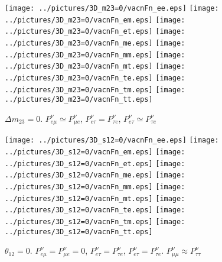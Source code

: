 \begin{figure}[!ht]
\vspace*{-0.75cm}
\texttt{[image: ../pictures/3D\_m23=0/vacnFn\_ee.eps]}\hspace*{-2mm}
\texttt{[image: ../pictures/3D\_m23=0/vacnFn\_em.eps]}\hspace*{-2mm}
\texttt{[image: ../pictures/3D\_m23=0/vacnFn\_et.eps]}\hspace*{-2mm}
\texttt{[image: ../pictures/3D\_m23=0/vacnFn\_me.eps]}\hspace*{-2mm}
\texttt{[image: ../pictures/3D\_m23=0/vacnFn\_mm.eps]}\hspace*{-2mm}
\texttt{[image: ../pictures/3D\_m23=0/vacnFn\_mt.eps]}\hspace*{-2mm}
\texttt{[image: ../pictures/3D\_m23=0/vacnFn\_te.eps]}\hspace*{-2mm}
\texttt{[image: ../pictures/3D\_m23=0/vacnFn\_tm.eps]}\hspace*{-2mm}
\texttt{[image: ../pictures/3D\_m23=0/vacnFn\_tt.eps]}
\caption{$\Delta{m_{23}}=0$. $P^{\nu}_{e\mu}\simeq{}P^{\nu}_{\mu{}e}$, $P^{\nu}_{e\tau}=P^{\nu}_{\tau{}e}$, $P^{\nu}_{e\tau}\simeq{}P^{\nu}_{\tau{}e}$}
\label{vacn3DFn_m23=0}
\end{figure}
\begin{figure}[!ht]
\vspace*{-0.75cm}
\texttt{[image: ../pictures/3D\_s12=0/vacnFn\_ee.eps]}\hspace*{-2mm}
\texttt{[image: ../pictures/3D\_s12=0/vacnFn\_em.eps]}\hspace*{-2mm}
\texttt{[image: ../pictures/3D\_s12=0/vacnFn\_et.eps]}\hspace*{-2mm}
\texttt{[image: ../pictures/3D\_s12=0/vacnFn\_me.eps]}\hspace*{-2mm}
\texttt{[image: ../pictures/3D\_s12=0/vacnFn\_mm.eps]}\hspace*{-2mm}
\texttt{[image: ../pictures/3D\_s12=0/vacnFn\_mt.eps]}\hspace*{-2mm}
\texttt{[image: ../pictures/3D\_s12=0/vacnFn\_te.eps]}\hspace*{-2mm}
\texttt{[image: ../pictures/3D\_s12=0/vacnFn\_tm.eps]}\hspace*{-2mm}
\texttt{[image: ../pictures/3D\_s12=0/vacnFn\_tt.eps]}
\caption{$\theta_{12}=0$. $P^{\nu}_{e\mu}=P^{\nu}_{\mu{}e}=0$, $P^{\nu}_{e\tau}=P^{\nu}_{\tau{}e}$, $P^{\nu}_{e\tau}=P^{\nu}_{\tau{}e}$. $P^{\nu}_{\mu\mu}\approx{}P^{\nu}_{\tau\tau}$}
\label{vacn3DFn_s12=0}
\end{figure}
